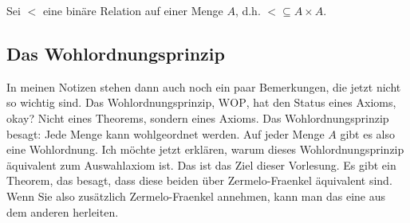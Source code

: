 \begin{math-stroke}[Wohlordnung]
Sei $<$ eine binäre Relation auf einer Menge $A$, d.h. $< \subseteq A \times A$.


\end{math-stroke}

\subsection{Das Wohlordnungsprinzip}

\begin{spoken-clean}[00:25:00 - 00:26:30]
In meinen Notizen stehen dann auch noch ein paar Bemerkungen, die jetzt nicht so wichtig sind. Das Wohlordnungsprinzip, $\text{WOP}$, hat den Status eines Axioms, okay? Nicht eines Theorems, sondern eines Axioms. Das Wohlordnungsprinzip besagt: Jede Menge kann wohlgeordnet werden. Auf jeder Menge $A$ gibt es also eine Wohlordnung. Ich möchte jetzt erklären, warum dieses Wohlordnungsprinzip äquivalent zum Auswahlaxiom ist. Das ist das Ziel dieser Vorlesung. Es gibt ein Theorem, das besagt, dass diese beiden über Zermelo-Fraenkel äquivalent sind. Wenn Sie also zusätzlich Zermelo-Fraenkel annehmen, kann man das eine aus dem anderen herleiten.
\end{spoken-clean}

